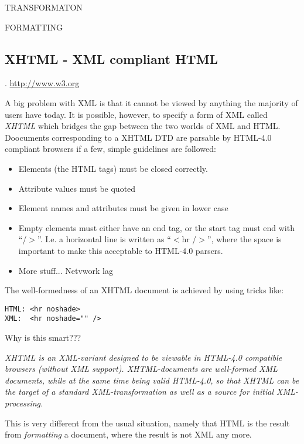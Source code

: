 \textsf{TRANSFORMATON}

\textsf{FORMATTING}



\subsection{XHTML - XML compliant HTML}

.
\url{http://www.w3.org}

A big problem with XML is that it cannot be viewed by anything the
majority of users have today.  It is possible, however, to specify a
form of XML called \textit{XHTML} which bridges the gap between the two worlds
of XML and HTML.  Doocuments corresponding to a XHTML DTD are parsable
by HTML-4.0 compliant browsers if a few, simple guidelines are
followed:

\begin{itemize}
\item Elements (the HTML tags) must be closed correctly.
  
\item Attribute values must be quoted
\item Element names and attributes must be given in lower case
  
\item Empty elements must either have an end tag, or the start tag
  must end with ``/$>$''.  I.e. a horizontal line is written as
  ``$<$hr /$>$'', where the space is important to make this acceptable
  to HTML-4.0 parsers.
\item \textsf{More stuff... Netvwork lag}
\end{itemize}

The well-formedness of an XHTML document is \textsf{achieved by using
  tricks like}:

\begin{verbatim}
HTML: <hr noshade>
XML:  <hr noshade="" />
\end{verbatim}


\textsf{Why is this smart???}

\textit{
\textsf{XHTML} is an XML-variant designed to be viewable in HTML-4.0
compatible browsers (without XML support).  XHTML-documents are
well-formed XML documents, while at the same time being valid
HTML-4.0, so that XHTML can be the target of a standard
XML-\textit{transformation} as well as a source for initial
XML-processing.}

This is very different from the usual situation, namely that HTML is
the result from \textit{formatting} a document, where the result is
not XML any more.


